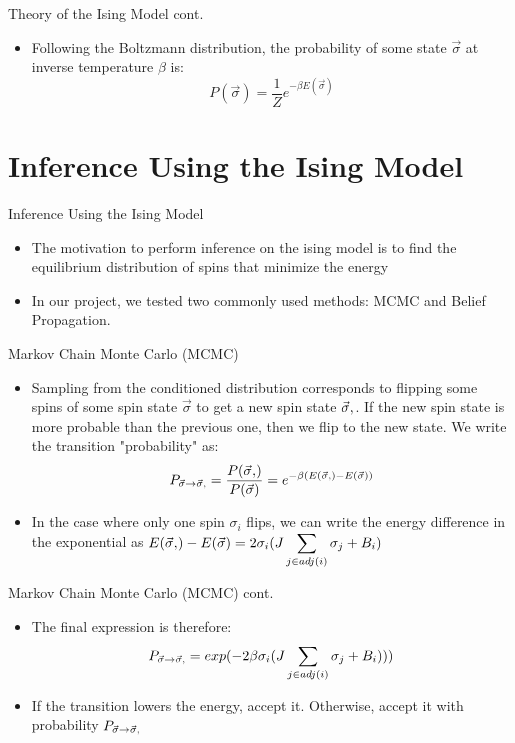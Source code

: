 \documentclass{minesbeamer}
\begin{document}
\begin{frame}{Theory of the Ising Model cont.}
    \centering
    \begin{itemize}
        \item Following the Boltzmann distribution, the probability of some state $\vec{\sigma}$ at inverse temperature $\beta$ is:$$P(\vec{\sigma}) = \frac{1}{Z}e^{-\beta E(\vec{\sigma})}$$
    \end{itemize}
\end{frame}

\section{Inference Using the Ising Model}

\begin{frame}{Inference Using the Ising Model}
    \centering
    \begin{itemize}
        \item The motivation to perform inference on the ising model is to find the equilibrium distribution of spins that minimize the energy
        \item In our project, we tested two commonly used methods: MCMC and Belief Propagation.
    \end{itemize}
\end{frame}

\begin{frame}{Markov Chain Monte Carlo (MCMC)}
    \centering
    \begin{itemize}
        \item Sampling from the conditioned distribution corresponds to flipping some spins of some spin state $\vec{\sigma}$ to get a new spin state $\vec{\sigma}\textsc{\char13}$. If the new spin state is more probable than the previous one, then we flip to the new state. We write the transition "probability" as: $$P_{\vec{\sigma} \to \vec{\sigma}\textsc{\char13}} = \frac{P(\vec{\sigma}\textsc{\char13})}{P(\vec{\sigma})}= e^{-\beta(E(\vec{\sigma}\textsc{\char13})-E(\vec{\sigma}))}$$ 
        \item In the case where only one spin $\sigma_i$ flips, we can write the energy difference in the exponential as $\displaystyle E(\vec{\sigma}\textsc{\char13})-E(\vec{\sigma}) = 2\sigma_i(J \sum_{j\in adj(i)} \sigma_j + B_i )$
    \end{itemize}
\end{frame}

\begin{frame}{Markov Chain Monte Carlo (MCMC) cont.}
    \centering
    \begin{itemize}
        \item The final expression is therefore: $$P_{\vec{\sigma} \to \vec{\sigma}\textsc{\char13}} = exp(-2\beta\sigma_i(J \sum_{j\in adj(i)} \sigma_j + B_i )))$$ 
        \item If the transition lowers the energy, accept it. Otherwise, accept it with probability $P_{\vec{\sigma} \to \vec{\sigma}\textsc{\char13}}$ 
    \end{itemize}
\end{frame}
\end{document}
